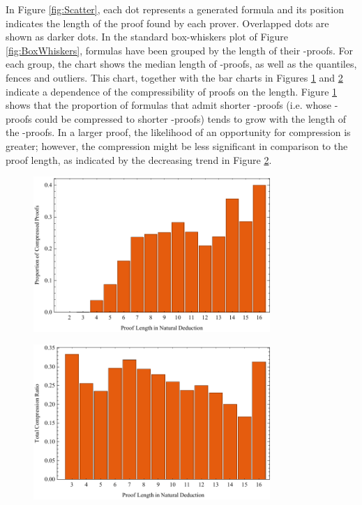 \documentclass{llncs}
\begin{document}
In Figure \ref{fig:Scatter}, each dot represents a generated formula and its position indicates the length of the proof found by each prover. Overlapped dots are shown as darker dots. In the standard box-whiskers plot of Figure \ref{fig:BoxWhiskers}, formulas have been grouped by the length of their {\ND}-proofs. For each group, the chart shows the median length of {\NDd}-proofs, as well as the quantiles, fences and outliers. This chart, together with the bar charts in Figures \ref{fig:ProportionByLength} and \ref{fig:CompressionByLength} indicate a dependence of the compressibility of proofs on the length. Figure \ref{fig:ProportionByLength} shows that the proportion of formulas that admit shorter {\NDd}-proofs (i.e. whose {\ND}-proofs could be compressed to shorter {\NDd}-proofs) tends to grow with the length of the {\ND}-proofs. In a larger proof, the likelihood of an opportunity for compression is greater; however, the compression might be less significant in comparison to the proof length, as indicated by the decreasing trend in Figure \ref{fig:CompressionByLength}.

\begin{figure}[!ht]
        \centering
        \includegraphics[width=0.8\textwidth]{Charts/ProportionByLength.pdf}
        \caption{ } \label{fig:ProportionByLength}
\end{figure}

\begin{figure}[!ht]
        \centering
        \includegraphics[width=0.8\textwidth]{Charts/CompressionByLength.pdf}
        \caption{ } \label{fig:CompressionByLength}
\end{figure}
\end{document}
